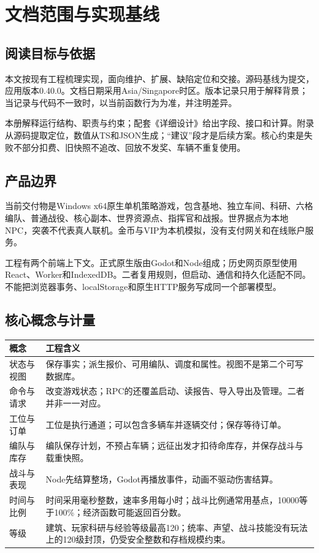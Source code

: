 \chapter{文档范围与实现基线}
\section{阅读目标与依据}
本文按现有工程梳理实现，面向维护、扩展、缺陷定位和交接。源码基线为提交，应用版本0.40.0。文档日期采用Asia/Singapore时区。版本记录只用于解释背景；当记录与代码不一致时，以当前函数行为为准，并注明差异。

本册解释运行结构、职责与约束；配套《详细设计》给出字段、接口和计算。附录从源码提取定位，数值从TS和JSON生成；“建议”段才是后续方案。核心约束是失败不部分扣费、旧快照不追改、回放不发奖、车辆不重复使用。

\section{产品边界}
当前交付物是Windows x64原生单机策略游戏，包含基地、独立车间、科研、六格编队、普通战役、核心副本、世界资源点、指挥官和战报。世界据点为本地NPC，突袭不代表真人联机。金币与VIP为本机模拟，没有支付网关和在线账户服务。

工程有两个前端上下文。正式原生版由Godot和Node组成；历史网页原型使用React、Worker和IndexedDB。二者复用规则，但启动、通信和持久化适配不同。不能把浏览器事务、localStorage和原生HTTP服务写成同一个部署模型。

\section{核心概念与计量}
\begin{small}\begin{longtable}{@{}P{27mm}P{121mm}@{}}
\toprule 概念 & 工程含义\\\midrule\endhead
状态与视图 & 保存事实；派生报价、可用编队、调度和属性。视图不是第二个可写数据库。\\
命令与请求 & 改变游戏状态；RPC的还覆盖启动、读报告、导入导出及管理。二者并非一一对应。\\
工位与订单 & 工位是执行通道；可以包含多辆车并逐辆交付；保存等待订单。\\
编队与库存 & 编队保存计划，不预占车辆；远征出发才扣待命库存，并保存战斗与载重快照。\\
战斗与表现 & Node先结算整场，Godot再播放事件，动画不驱动伤害结算。\\
时间与比例 & 时间采用毫秒整数，速率多用每小时；战斗比例通常用基点，10000等于100\%；经济函数可能返回百分数。\\
等级 & 建筑、玩家科研与经验等级最高120；统率、声望、战斗技能没有玩法上的120级封顶，仍受安全整数和存档规模约束。\\
\bottomrule\end{longtable}\end{small}
